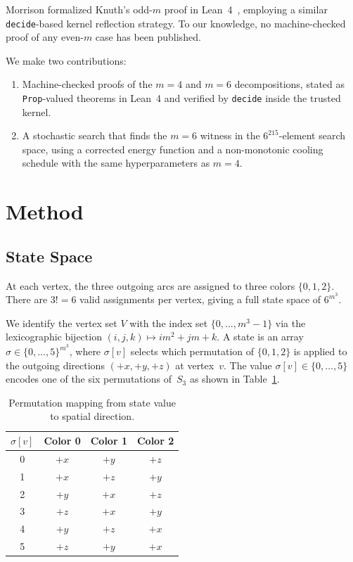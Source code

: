 \documentclass[11pt]{article}
\theoremstyle{plain}
\begin{document}
Morrison formalized Knuth's odd-$m$ proof in Lean~4~\cite{morrison2026},
employing a similar \texttt{decide}-based kernel reflection strategy.
To our knowledge, no machine-checked proof of any even-$m$ case has been
published.

We make two contributions:
\begin{enumerate}
  \item Machine-checked proofs of the $m = 4$ and $m = 6$ decompositions,
  stated as \texttt{Prop}-valued theorems in Lean~4 and verified by
  \texttt{decide} inside the trusted kernel.
  \item A stochastic search that finds the $m=6$ witness in the
  $6^{215}$-element search space, using a corrected energy function and a
  non-monotonic cooling schedule with the same hyperparameters as $m=4$.
\end{enumerate}

\section{Method}

\subsection{State Space}

At each vertex, the three outgoing arcs are assigned to three colors
$\{0, 1, 2\}$. There are $3! = 6$ valid assignments per vertex, giving a
full state space of $6^{m^3}$.

We identify the vertex set $V$ with the index set $\{0, \ldots, m^3{-}1\}$
via the lexicographic bijection $(i,j,k) \mapsto im^2 + jm + k$.
A state is an array $\sigma \in \{0, \ldots, 5\}^{m^3}$, where
$\sigma[v]$ selects which permutation of $\{0,1,2\}$ is applied to the
outgoing directions $(+x, +y, +z)$ at vertex~$v$. The value
$\sigma[v] \in \{0,\ldots,5\}$ encodes one of the six permutations
of~$S_3$ as shown in Table~\ref{tab:permutations}.

\begin{table}[h]
\centering
\caption{Permutation mapping from state value to spatial direction.}
\label{tab:permutations}
\begin{tabular}{@{}cccc@{}}
\toprule
$\sigma[v]$ & Color 0 & Color 1 & Color 2 \\
\midrule
0 & $+x$ & $+y$ & $+z$ \\
1 & $+x$ & $+z$ & $+y$ \\
2 & $+y$ & $+x$ & $+z$ \\
3 & $+z$ & $+x$ & $+y$ \\
4 & $+y$ & $+z$ & $+x$ \\
5 & $+z$ & $+y$ & $+x$ \\
\bottomrule
\end{tabular}
\end{table}
\end{document}
